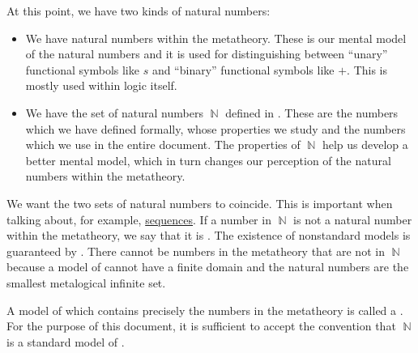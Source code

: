 \begin{remark}\label{rem:standard_models_of_arithmetic}
  At this point, we have two kinds of natural numbers:
  \begin{itemize}
    \item We have natural numbers within the metatheory. These is our mental model of the natural numbers and it is used for distinguishing between \enquote{unary} functional symbols like \( s \) and \enquote{binary} functional symbols like \( + \). This is mostly used within logic itself.

    \item We have the set of natural numbers \( \BbbN \) defined in . These are the numbers which we have defined formally, whose properties we study and the numbers which we use in the entire document. The properties of \( \BbbN \) help us develop a better mental model, which in turn changes our perception of the natural numbers within the metatheory.
  \end{itemize}

  We want the two sets of natural numbers to coincide. This is important when talking about, for example, \hyperref[def:sequence]{sequences}. If a number in \( \BbbN \) is not a natural number within the metatheory, we say that it is . The existence of nonstandard models is guaranteed by . There cannot be numbers in the metatheory that are not in \( \BbbN \) because a model of  cannot have a finite domain and the natural numbers are the smallest metalogical infinite set.

  A model of  which contains precisely the numbers in the metatheory is called a . For the purpose of this document, it is sufficient to accept the convention that \( \BbbN \) is a standard model of .
\end{remark}

